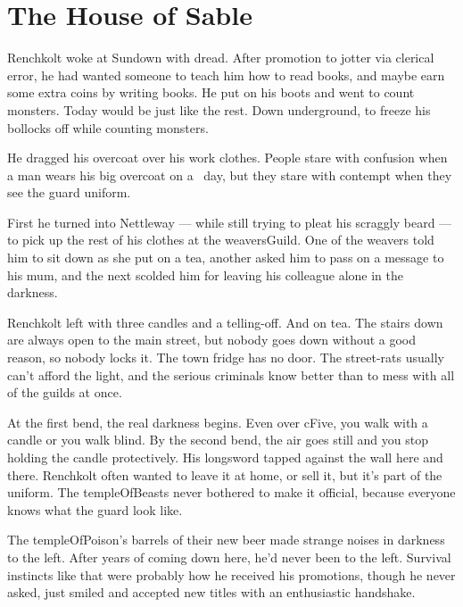 \section{The House of Sable}



\begin{exampletext}
  Renchkolt woke at Sundown with dread.
  \ifcase\value{temperature}%
    After promotion to \gls{jotter} via clerical error, he had wanted someone to teach him how to read books, and maybe earn some extra coins by writing books.
    He put on his boots and went to count \glspl{monster}.
  \or%
    Today would be just like the rest.
    Down underground, to freeze his bollocks off while counting \glspl{monster}.

  \else%
    He dragged his overcoat over his work clothes.
    People stare with confusion when a man wears his big overcoat on a \showTemperature\ day, but they stare with contempt when they see the \gls{guard} uniform.
  \fi%

  First he turned into Nettleway --- while still trying to pleat his scraggly beard --- to pick up the rest of his clothes at the \gls{weaversGuild}.
  One of the \glspl{weaver} told him to sit down as she put on a tea, another asked him to pass on a message to his mum, and the next scolded him for leaving his colleague alone in the darkness.

  Renchkolt left with three candles and a telling-off.
  And on tea.
  The stairs down are always open to the main street, but nobody goes down without a good reason, so nobody locks it.
  The town fridge has no door.
  The street-rats usually can't afford the light, and the serious criminals know better than to mess with all of the \glspl{guild} at once.

  At the first bend, the real darkness begins.
  Even over \gls{cFive}, you walk with a candle or you walk blind.
  By the second bend, the air goes still and you stop holding the candle protectively.
  His longsword tapped against the wall here and there.
  Renchkolt often wanted to leave it at home, or sell it, but it's part of the uniform.
  The \gls{templeOfBeasts} never bothered to make it official, because everyone knows what the \gls{guard} look like.

  The \gls{templeOfPoison}'s barrels of their new beer made strange noises in darkness to the left.
  After years of coming down here, he'd never been to the left.
  Survival instincts like that were probably how he received his promotions, though he never asked, just smiled and accepted new titles with an enthusiastic handshake.


\end{exampletext}
